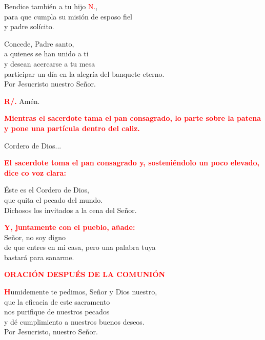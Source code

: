 \documentclass[12pt, letterpaper]{report}
\begin{document}
Bendice tambi\'en a tu hijo \textcolor{red}{N.}, \\
para que cumpla su misi\'on de esposo fiel \\
y padre sol\'icito. \newline

Concede, Padre santo, \\
a quienes se han unido a ti \\
y desean acercarse a tu mesa \\
participar un d\'ia en la alegr\'ia del banquete eterno. \\
Por Jesucristo nuestro Se\~nor. \newline

\Large \hspace{-0.9cm} {\bfseries \textcolor{red}{R/.}} \hspace{0.5cm} Am\'en.\newline

\large{\bfseries \textcolor{red}{Mientras el sacerdote tama el pan consagrado, lo parte sobre la patena y pone una part\'icula dentro del caliz.}}\newline

\Large Cordero de Dios...\newline

\large{\bfseries \textcolor{red}{El sacerdote toma el pan consagrado y, sosteni\'endolo un poco elevado, dice co voz clara:}}\newline

\Large \'Este es el Cordero de Dios,\\
que quita el pecado del mundo.\\
Dichosos los invitados a la cena del Se\~nor. \newline


\large{\bfseries \textcolor{red}{Y, juntamente con el pueblo, a\~nade:}}\newline \\

\Large Se\~nor, no soy digno\\
de que entres en mi casa,
pero una palabra tuya\\
bastar\'a para sanarme.\newline

\Large {\bfseries \textcolor{red}{ORACI\'ON DESPU\'ES DE LA COMUNI\'ON}}

\lettrine[lines=1]{\bfseries \textcolor{red}{H}}{}\Large umidemente te pedimos, Se\~nor y Dios nuestro, \\
que la eficacia de este sacramento \\
nos purifique de nuestros pecados \\
y d\'e cumplimiento a nuestros buenos deseos. \\
Por Jesucristo, nuestro Se\~nor.
\end{document}
